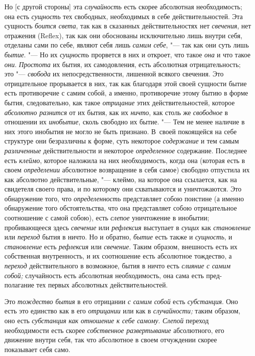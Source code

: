Но [с другой стороны] эта {\em случайность} есть скорее
абсолютная необходимость; она есть {\em сущность} тех
свободных, необходимых в себе действительностей. Эта сущность
{\em боится света}, так как в сказанных
действительностях нет {\em свечения}, нет отражения
(Reflex), так как они обоснованы исключительно лишь внутри себя, отделаны
сами по себе, являют себя лишь {\em самим себе}, "--- так
как они суть лишь {\em бытие}. "--- Но их
{\em сущность} прорвется в них и откроет, что такое
{\em она} и что такое {\em они}.
{\em Простота} их бытия, их самодовления, есть
абсолютная отрицательность; это "--- {\em свобода} их
непосредственности, лишенной всякого свечения. Это отрицательное
прорывается в них, так как благодаря этой своей сущности бытие есть
противоречие с самим собой, а именно, противоречие этому бытию в форме
бытия, следовательно, как такое {\em отрицание} этих
действительностей, которое {\em абсолютно разнится} от
их бытия, как их {\em ничто}, как столь же
{\em свободное} в отношении их
{\em инобытие}, сколь свободно их бытие. "--- Тем не менее
наличие в них этого инобытия не могло не быть признано. В~своей покоящейся
на себе структуре они безразличны к форме, суть некоторое
{\em содержание} и тем самым
{\em различенные} действительности и некоторое
{\em определенное} содержание. Последнее есть
{\em клеймо}, которое наложила на них необходимость,
когда она (которая есть в своем {\em определении}
абсолютное возвращение в себя самое) свободно отпустила их как абсолютно
действительные, "--- клеймо, на которое она ссылается, как на свидетеля своего
права, и по которому они схватываются и уничтожаются. Это обнаружение того,
что {\em определенность} представляет собою поистине (а
именно обнаружение того обстоятельства, что она представляет собою
отрицательное соотношение с самой собою), есть
{\em слепое} уничтожение в инобытии; пробивающееся
здесь {\em свечение} или {\em рефлексия} выступает в
{\em сущих} как {\em становление}
или {\em переход} бытия в ничто. Но и обратно, {\em бытие} есть также и
{\em сущность}, и {\em становление} есть {\em рефлексия} или
{\em свечение}. Таким образом, внешность есть их
собственная внутренность, и их соотношение есть абсолютное тождество, а
{\em переход} действительного в возможное, бытия в
ничто есть {\em слияние с самим собой;} случайность
есть абсолютная необходимость, она сама есть пред-полагание тех первых
абсолютных действительностей.

Это {\em тождество бытия} в его отрицании {\em с самим собой} есть
{\em субстанция}. Оно есть это единство как в его {\em отрицании} или
как в {\em случайности;} таким образом, оно есть {\em субстанция как
отношение к себе самому}. {\em Слепой} переход необходимости есть скорее
{\em собственное развертывание} абсолютного, его движение внутри себя,
так что абсолютное в своем отчуждении скорее показывает себя само.
